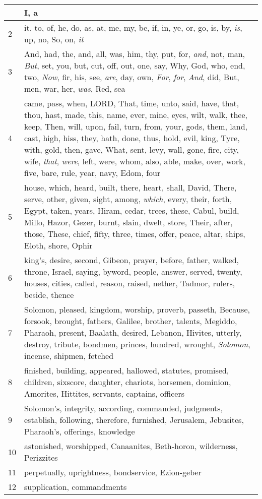 \begin{longtable}{l|p{3.75in}}
\hline \hline
\endlastfoot
1 & I, a \\ \hline
2 & it, to, of, he, do, as, at, me, my, be, if, in, ye, or, go, is, by, \emph{is}, up, no, So, on, \emph{it} \\ \hline
3 & And, had, the, and, all, was, him, thy, put, for, \emph{and}, not, man, \emph{But}, set, you, but, cut, off, out, one, say, Why, God, who, end, two, \emph{Now}, fir, his, see, \emph{are}, day, own, \emph{For}, \emph{for}, \emph{And}, did, But, men, war, her, \emph{was}, Red, sea \\ \hline
4 & came, pass, when, LORD, That, time, unto, said, have, that, thou, hast, made, this, name, ever, mine, eyes, wilt, walk, thee, keep, Then, will, upon, fail, turn, from, your, gods, them, land, cast, high, hiss, they, hath, done, thus, hold, evil, king, Tyre, with, gold, then, gave, What, sent, levy, wall, gone, fire, city, wife, \emph{that}, \emph{were}, left, were, whom, also, able, make, over, work, five, bare, rule, year, navy, Edom, four \\ \hline
5 & house, which, heard, built, there, heart, shall, David, There, serve, other, given, sight, among, \emph{which}, every, their, forth, Egypt, taken, years, Hiram, cedar, trees, these, Cabul, build, Millo, Hazor, Gezer, burnt, slain, dwelt, store, Their, after, those, These, chief, fifty, three, times, offer, peace, altar, ships, Eloth, shore, Ophir \\ \hline
6 & king's, desire, second, Gibeon, prayer, before, father, walked, throne, Israel, saying, byword, people, answer, served, twenty, houses, cities, called, reason, raised, nether, Tadmor, rulers, beside, thence \\ \hline
7 & Solomon, pleased, kingdom, worship, proverb, passeth, Because, forsook, brought, fathers, Galilee, brother, talents, Megiddo, Pharaoh, present, Baalath, desired, Lebanon, Hivites, utterly, destroy, tribute, bondmen, princes, hundred, wrought, \emph{Solomon}, incense, shipmen, fetched \\ \hline
8 & finished, building, appeared, hallowed, statutes, promised, children, sixscore, daughter, chariots, horsemen, dominion, Amorites, Hittites, servants, captains, officers \\ \hline
9 & Solomon's, integrity, according, commanded, judgments, establish, following, therefore, furnished, Jerusalem, Jebusites, Pharaoh's, offerings, knowledge \\ \hline
10 & astonished, worshipped, Canaanites, Beth-horon, wilderness, Perizzites \\ \hline
11 & perpetually, uprightness, bondservice, Ezion-geber \\ \hline
12 & supplication, commandments \\ \hline
\end{longtable}






